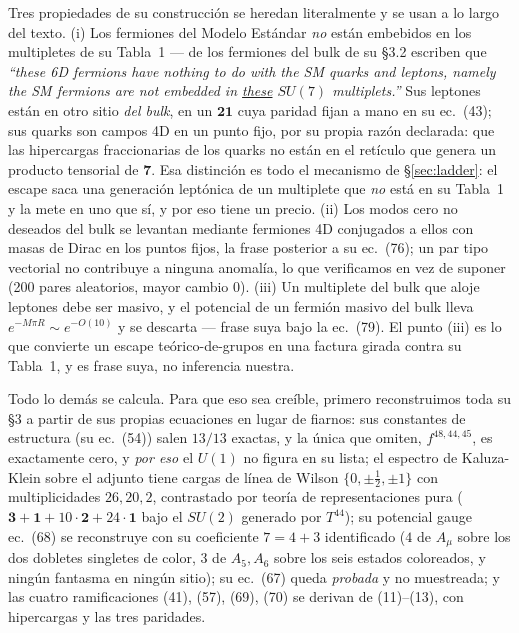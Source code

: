 \documentclass[11pt,a4paper]{article}
\newcommand{\su}[1]{SU(#1)}
\newcommand{\rep}[1]{\mathbf{#1}}
\begin{document}
Tres propiedades de su construcción se heredan literalmente y se usan a lo largo del texto. (i) Los
fermiones del Modelo Estándar \emph{no} están embebidos en los multipletes de su Tabla~1 --- de los
fermiones del bulk de su \S3.2 escriben que \emph{``these 6D fermions have nothing to do with the SM
quarks and leptons, namely the SM fermions are not embedded in \underline{these} $\su7$
multiplets.''} Sus leptones están en otro sitio \emph{del bulk}, en un $\rep{21}$ cuya paridad fijan
a mano en su ec.~(43); sus quarks son campos 4D en un punto fijo, por su propia razón declarada: que
las hipercargas fraccionarias de los quarks no están en el retículo que genera un producto tensorial
de $\rep7$. Esa distinción es todo el mecanismo de \S\ref{sec:ladder}: el escape saca una generación
leptónica de un multiplete que \emph{no} está en su Tabla~1 y la mete en uno que sí, y por eso tiene
un precio. (ii) Los modos cero no deseados del bulk se levantan mediante fermiones 4D conjugados a
ellos con masas de Dirac en los puntos fijos, la frase posterior a su ec.~(76); un par tipo vectorial
no contribuye a ninguna anomalía, lo que verificamos en vez de suponer (200 pares aleatorios, mayor
cambio $0$). (iii) Un multiplete del bulk que aloje leptones debe ser masivo, y el potencial de un
fermión masivo del bulk lleva $e^{-M\pi R}\sim e^{-O(10)}$ y se descarta --- frase suya bajo la
ec.~(79). El punto (iii) es lo que convierte un escape teórico-de-grupos en una factura girada contra
su Tabla~1, y es frase suya, no inferencia nuestra.

Todo lo demás se calcula. Para que eso sea creíble, primero reconstruimos toda su \S3 a partir de sus
propias ecuaciones en lugar de fiarnos: sus constantes de estructura (su ec.~(54)) salen $13/13$
exactas, y la única que omiten, $f^{48,44,45}$, es exactamente cero, y \emph{por eso} el $U(1)$ no figura en su lista; el espectro de Kaluza-Klein sobre el adjunto tiene cargas de línea de Wilson
$\{0,\pm\tfrac12,\pm1\}$ con multiplicidades $26,20,2$, contrastado por teoría de representaciones
pura ($\rep3+\rep1+10\cdot\rep2+24\cdot\rep1$ bajo el $\su2$ generado por $T^{44}$); su potencial
gauge ec.~(68) se reconstruye con su coeficiente $7=4+3$ identificado ($4$ de $A_\mu$ sobre los dos
dobletes singletes de color, $3$ de $A_5,A_6$ sobre los seis estados coloreados, y ningún fantasma en
ningún sitio); su ec.~(67) queda \emph{probada} y no muestreada; y las cuatro ramificaciones (41),
(57), (69), (70) se derivan de (11)--(13), con hipercargas y las tres paridades.
\end{document}
